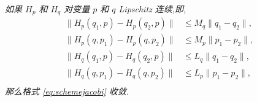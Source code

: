 \begin{theorem}\label{thm:sj}\\
\emph{如果 $H_{p}$ 和 $H_{q}$ 对变量 $p$ 和 $q$ Lipschitz 连续,即,
\begin{equation*}
  \begin{aligned}
    \|H_{p}(q_{1},p)-H_{p}(q_{2},p)\| &\le M_{q} \|q_{1}-q_{2}\|, \\
    \|H_{p}(q,p_{1})-H_{p}(q,p_{2})\| &\le M_{p} \|p_{1}-p_{2}\|, \\
    \|H_{q}(q_{1},p)-H_{q}(q_{2},p)\| &\le L_{q} \|q_{1}-q_{2}\|, \\
    \|H_{q}(q,p_{1})-H_{q}(q,p_{2})\| &\le L_{p} \|p_{1}-p_{2}\|, \\
  \end{aligned}
\end{equation*}
那么格式 \eqref{eq:schemejacobi} 收敛.}
\end{theorem}

